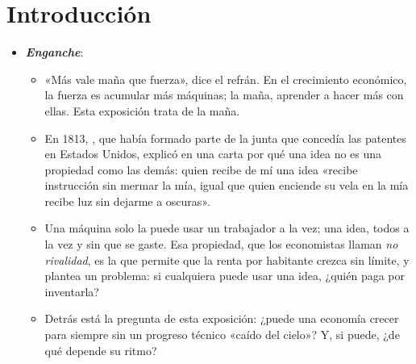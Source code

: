 \documentclass[11pt]{article}
\begin{document}
\tceetitulo

\section*{Introducción}

\begin{itemize}
\item \textbf{\emph{Enganche}}:
  \begin{itemize}
  \item «Más vale maña que fuerza», dice el refrán. En el crecimiento económico, la fuerza es acumular más máquinas; la maña, aprender a hacer más con ellas. Esta exposición trata de la maña.
  \item En 1813, , que había formado parte de la junta que concedía las patentes en Estados Unidos, explicó en una carta por qué una idea no es una propiedad como las demás: quien recibe de mí una idea «recibe instrucción sin mermar la mía, igual que quien enciende su vela en la mía recibe luz sin dejarme a oscuras»\nocite{Jefferson1813McPherson}.
  \item Una máquina solo la puede usar un trabajador a la vez; una idea, todos a la vez y sin que se gaste. Esa propiedad, que los economistas llaman \emph{no rivalidad}, es la que permite que la renta por habitante crezca sin límite, y plantea un problema: si cualquiera puede usar una idea, ¿quién paga por inventarla?
  \item Detrás está la pregunta de esta exposición: ¿puede una economía crecer para siempre sin un progreso técnico «caído del cielo»? Y, si puede, ¿de qué depende su ritmo?
  \end{itemize}


\end{itemize}
\end{document}
